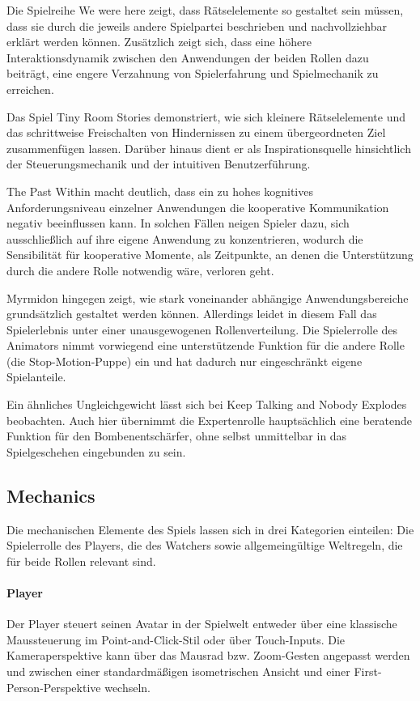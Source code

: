 Die Spielreihe We were here zeigt, dass Rätselelemente so gestaltet sein müssen, dass sie durch die jeweils andere Spielpartei beschrieben und nachvollziehbar erklärt werden können. Zusätzlich zeigt sich, dass eine höhere Interaktionsdynamik zwischen den Anwendungen der beiden Rollen dazu beiträgt, eine engere Verzahnung von Spielerfahrung und Spielmechanik zu erreichen.

Das Spiel Tiny Room Stories demonstriert, wie sich kleinere Rätselelemente und das schrittweise Freischalten von Hindernissen zu einem übergeordneten Ziel zusammenfügen lassen. Darüber hinaus dient er als Inspirationsquelle hinsichtlich der Steuerungsmechanik und der intuitiven Benutzerführung.

The Past Within macht deutlich, dass ein zu hohes kognitives Anforderungsniveau einzelner Anwendungen die kooperative Kommunikation negativ beeinflussen kann. In solchen Fällen neigen Spieler dazu, sich ausschließlich auf ihre eigene Anwendung zu konzentrieren, wodurch die Sensibilität für kooperative Momente, als Zeitpunkte, an denen die Unterstützung durch die andere Rolle notwendig wäre, verloren geht.

Myrmidon hingegen zeigt, wie stark voneinander abhängige Anwendungsbereiche grundsätzlich gestaltet werden können. Allerdings leidet in diesem Fall das Spielerlebnis unter einer unausgewogenen Rollenverteilung. Die Spielerrolle des Animators nimmt vorwiegend eine unterstützende Funktion für die andere Rolle (die Stop-Motion-Puppe) ein und hat dadurch nur eingeschränkt eigene Spielanteile.

Ein ähnliches Ungleichgewicht lässt sich bei Keep Talking and Nobody Explodes beobachten. Auch hier übernimmt die Expertenrolle hauptsächlich eine beratende Funktion für den Bombenentschärfer, ohne selbst unmittelbar in das Spielgeschehen eingebunden zu sein.

\subsection{Mechanics}
Die mechanischen Elemente des Spiels lassen sich in drei Kategorien einteilen: Die Spielerrolle des Players, die des Watchers sowie allgemeingültige Weltregeln, die für beide Rollen relevant sind.

\paragraph{Player}

Der Player steuert seinen Avatar in der Spielwelt entweder über eine klassische Maussteuerung im Point-and-Click-Stil oder über Touch-Inputs. Die Kameraperspektive kann über das Mausrad bzw. Zoom-Gesten angepasst werden und zwischen einer standardmäßigen isometrischen Ansicht und einer First-Person-Perspektive wechseln.

